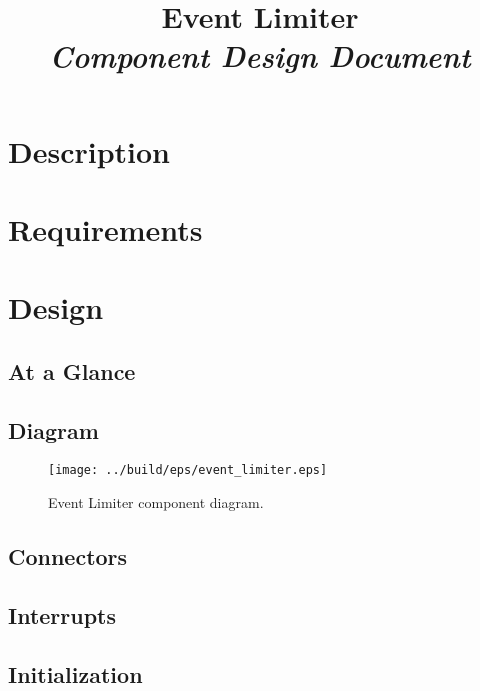 



\title{\textbf{Event Limiter} \\
\large\textit{Component Design Document}}
\date{}
\maketitle

\section{Description}


\section{Requirements}


\section{Design}

\subsection{At a Glance}


\subsection{Diagram}
\begin{figure}[H]
  \texttt{[image: ../build/eps/event\_limiter.eps]}
  \caption{Event Limiter component diagram.}
\end{figure}

\subsection{Connectors}


\subsection{Interrupts}



\subsection{Initialization}


